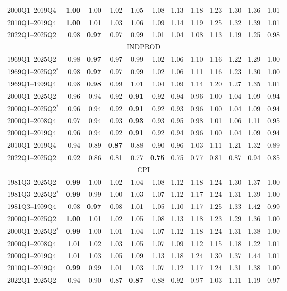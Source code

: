\begin{tabular}{lrrrrrrrrrrr}
2000Q1--2019Q4 & \textbf{1.00} & 1.00 & 1.02 & 1.05 & 1.08 & 1.13 & 1.18 & 1.23 & 1.30 & 1.36 & 1.01 \\
2010Q1--2019Q4 & \textbf{1.00} & 1.01 & 1.03 & 1.06 & 1.09 & 1.14 & 1.19 & 1.25 & 1.32 & 1.39 & 1.01 \\
2022Q1--2025Q2 & 0.98 & \textbf{0.97} & 0.97 & 0.99 & 1.01 & 1.04 & 1.08 & 1.13 & 1.19 & 1.25 & 0.98 \\
\hline
\multicolumn{12}{c}{INDPROD} \\
1969Q1--2025Q2 & 0.98 & \textbf{0.97} & 0.97 & 0.99 & 1.02 & 1.06 & 1.10 & 1.16 & 1.22 & 1.29 & 1.00 \\
1969Q1--2025Q2$^*$ & 0.98 & \textbf{0.97} & 0.97 & 0.99 & 1.02 & 1.06 & 1.11 & 1.16 & 1.23 & 1.30 & 1.00 \\
1969Q1--1999Q4 & 0.98 & \textbf{0.98} & 0.99 & 1.01 & 1.04 & 1.09 & 1.14 & 1.20 & 1.27 & 1.35 & 1.01 \\
2000Q1--2025Q2 & 0.96 & 0.94 & 0.92 & \textbf{0.91} & 0.92 & 0.94 & 0.96 & 1.00 & 1.04 & 1.09 & 0.94 \\
2000Q1--2025Q2$^*$ & 0.96 & 0.94 & 0.92 & \textbf{0.91} & 0.92 & 0.93 & 0.96 & 1.00 & 1.04 & 1.09 & 0.94 \\
2000Q1--2008Q4 & 0.97 & 0.94 & 0.93 & \textbf{0.93} & 0.93 & 0.95 & 0.98 & 1.01 & 1.06 & 1.11 & 0.95 \\
2000Q1--2019Q4 & 0.96 & 0.94 & 0.92 & \textbf{0.91} & 0.92 & 0.94 & 0.96 & 1.00 & 1.04 & 1.09 & 0.94 \\
2010Q1--2019Q4 & 0.94 & 0.89 & \textbf{0.87} & 0.88 & 0.90 & 0.96 & 1.03 & 1.11 & 1.21 & 1.32 & 0.89 \\
2022Q1--2025Q2 & 0.92 & 0.86 & 0.81 & 0.77 & \textbf{0.75} & 0.75 & 0.77 & 0.81 & 0.87 & 0.94 & 0.85 \\
\hline
\multicolumn{12}{c}{CPI} \\
1981Q3--2025Q2 & \textbf{0.99} & 1.00 & 1.02 & 1.04 & 1.08 & 1.12 & 1.18 & 1.24 & 1.30 & 1.37 & 1.00 \\
1981Q3--2025Q2$^*$ & \textbf{0.99} & 0.99 & 1.00 & 1.03 & 1.07 & 1.12 & 1.17 & 1.24 & 1.31 & 1.39 & 1.00 \\
1981Q3--1999Q4 & 0.98 & \textbf{0.97} & 0.98 & 1.01 & 1.05 & 1.10 & 1.17 & 1.25 & 1.33 & 1.42 & 0.99 \\
2000Q1--2025Q2 & \textbf{1.00} & 1.01 & 1.02 & 1.05 & 1.08 & 1.13 & 1.18 & 1.23 & 1.29 & 1.36 & 1.00 \\
2000Q1--2025Q2$^*$ & \textbf{0.99} & 1.00 & 1.01 & 1.04 & 1.07 & 1.12 & 1.18 & 1.24 & 1.31 & 1.38 & 1.00 \\
2000Q1--2008Q4 & 1.01 & 1.02 & 1.03 & 1.05 & 1.07 & 1.09 & 1.12 & 1.15 & 1.18 & 1.22 & 1.01 \\
2000Q1--2019Q4 & 1.01 & 1.03 & 1.05 & 1.09 & 1.13 & 1.18 & 1.24 & 1.30 & 1.37 & 1.44 & 1.01 \\
2010Q1--2019Q4 & \textbf{0.99} & 0.99 & 1.01 & 1.03 & 1.07 & 1.12 & 1.17 & 1.24 & 1.31 & 1.38 & 1.00 \\
2022Q1--2025Q2 & 0.94 & 0.90 & 0.87 & \textbf{0.87} & 0.88 & 0.92 & 0.97 & 1.03 & 1.11 & 1.19 & 0.97 \\
\hline
\end{tabular}
